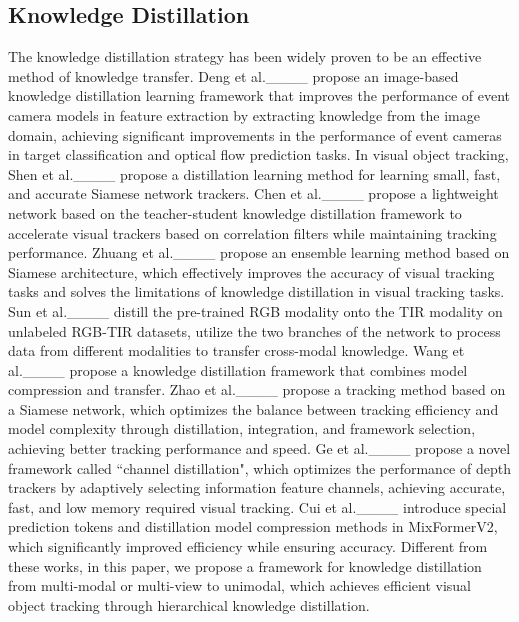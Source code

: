 \subsection{Knowledge Distillation}  \label{subsec:kd}
The knowledge distillation strategy has been widely proven to be an effective method of knowledge transfer.
Deng et al.____ propose an image-based knowledge distillation learning framework that improves the performance of event camera models in feature extraction by extracting knowledge from the image domain, achieving significant improvements in the performance of event cameras in target classification and optical flow prediction tasks. 
In visual object tracking, Shen et al.____ propose a distillation learning method for learning small, fast, and accurate Siamese network trackers. 
Chen et al.____ propose a lightweight network based on the teacher-student knowledge distillation framework to accelerate visual trackers based on correlation filters while maintaining tracking performance.
Zhuang et al.____ propose an ensemble learning method based on Siamese architecture, which effectively improves the accuracy of visual tracking tasks and solves the limitations of knowledge distillation in visual tracking tasks.
Sun et al.____ distill the pre-trained RGB modality onto the TIR modality on unlabeled RGB-TIR datasets, utilize the two branches of the network to process data from different modalities to transfer cross-modal knowledge. 
Wang et al.____ propose a knowledge distillation framework that combines model compression and transfer. 
Zhao et al.____ propose a tracking method based on a Siamese network, which optimizes the balance between tracking efficiency and model complexity through distillation, integration, and framework selection, achieving better tracking performance and speed. 
Ge et al.____ propose a novel framework called ``channel distillation", which optimizes the performance of depth trackers by adaptively selecting information feature channels, achieving accurate, fast, and low memory required visual tracking. 
Cui et al.____ introduce special prediction tokens and distillation model compression methods in MixFormerV2, which significantly improved efficiency while ensuring accuracy. 
Different from these works, in this paper, we propose a framework for knowledge distillation from multi-modal or multi-view to unimodal, which achieves efficient visual object tracking through hierarchical knowledge distillation. 



